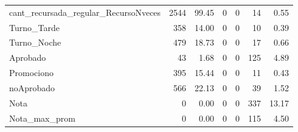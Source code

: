 \begin{table}[!h]
{\begin{tabular}[t]{lrrrrrr}
			\addlinespace
			cant\_recursada\_regular\_RecursoNveces & 2544 & 99.45 & 0 & 0 & 14 & 0.55\\
			\rowcolor{gray!6}  Turno\_Tarde & 358 & 14.00 & 0 & 0 & 10 & 0.39\\
			Turno\_Noche & 479 & 18.73 & 0 & 0 & 17 & 0.66\\
			\rowcolor{gray!6}  Aprobado & 43 & 1.68 & 0 & 0 & 125 & 4.89\\
			Promociono & 395 & 15.44 & 0 & 0 & 11 & 0.43\\
			\addlinespace
			\rowcolor{gray!6}  noAprobado & 566 & 22.13 & 0 & 0 & 39 & 1.52\\
			Nota & 0 & 0.00 & 0 & 0 & 337 & 13.17\\
			\rowcolor{gray!6}  Nota\_max\_prom & 0 & 0.00 & 0 & 0 & 115 & 4.50\\
			\bottomrule
	\end{tabular}}
\end{table}